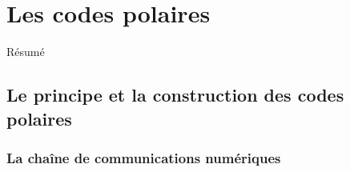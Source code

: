 
\chapter{Les codes polaires}

Résumé

\vspace*{\fill}
\minitocTITI
\vspace*{\fill}


\section{Le principe et la construction des codes polaires}

\subsection{La chaîne de communications numériques}
\label{subsec:contexte}


